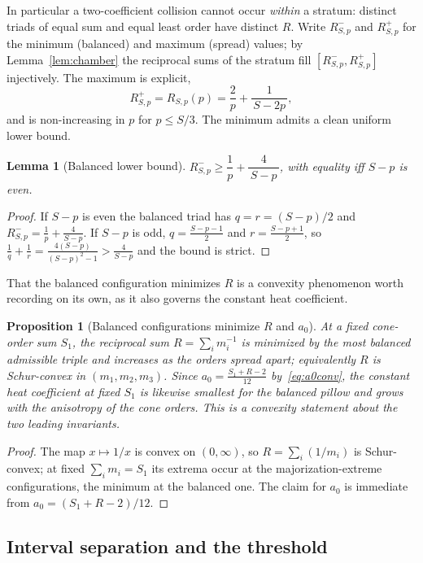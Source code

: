 \documentclass[12pt, letterpaper]{article}
\theoremstyle{definition}
\theoremstyle{plain}
\newtheorem{lemma}[theorem]{Lemma}
\newtheorem{proposition}[theorem]{Proposition}
\begin{document}
In particular a two-coefficient collision cannot occur \emph{within} a stratum: distinct triads of equal sum and equal least order have distinct $R$. Write $R^{-}_{S,p}$ and $R^{+}_{S,p}$ for the minimum (balanced) and maximum (spread) values; by Lemma~\ref{lem:chamber} the reciprocal sums of the stratum fill $[R^{-}_{S,p},R^{+}_{S,p}]$ injectively. The maximum is explicit,
\[
    R^{+}_{S,p}=R_{S,p}(p)=\frac2p+\frac1{\,S-2p\,},
\]
and is non-increasing in $p$ for $p\le S/3$. The minimum admits a clean uniform lower bound.

\begin{lemma}[Balanced lower bound]\label{lem:bound}
$R^{-}_{S,p}\ge \dfrac1p+\dfrac4{\,S-p\,}$, with equality iff $S-p$ is even.
\end{lemma}
\begin{proof}
If $S-p$ is even the balanced triad has $q=r=(S-p)/2$ and $R^{-}_{S,p}=\tfrac1p+\tfrac4{S-p}$. If $S-p$ is odd, $q=\tfrac{S-p-1}2$ and $r=\tfrac{S-p+1}2$, so $\tfrac1q+\tfrac1r=\tfrac{4(S-p)}{(S-p)^2-1}>\tfrac4{S-p}$ and the bound is strict.
\end{proof}

That the balanced configuration minimizes $R$ is a convexity phenomenon worth recording on its own, as it also governs the constant heat coefficient.

\begin{proposition}[Balanced configurations minimize $R$ and $a_0$]\label{prop:min}
At a fixed cone-order sum $S_1$, the reciprocal sum $R=\sum_i m_i^{-1}$ is minimized by the most balanced admissible triple and increases as the orders spread apart; equivalently $R$ is Schur-convex in $(m_1,m_2,m_3)$. Since $a_0=\tfrac{S_1+R-2}{12}$ by~\eqref{eq:a0conv}, the constant heat coefficient at fixed $S_1$ is likewise smallest for the balanced pillow and grows with the anisotropy of the cone orders. This is a convexity statement about the two leading invariants.
\end{proposition}
\begin{proof}
The map $x\mapsto1/x$ is convex on $(0,\infty)$, so $R=\sum_i(1/m_i)$ is Schur-convex; at fixed $\sum_i m_i=S_1$ its extrema occur at the majorization-extreme configurations, the minimum at the balanced one. The claim for $a_0$ is immediate from $a_0=(S_1+R-2)/12$.
\end{proof}

\subsection{Interval separation and the threshold}
\end{document}
